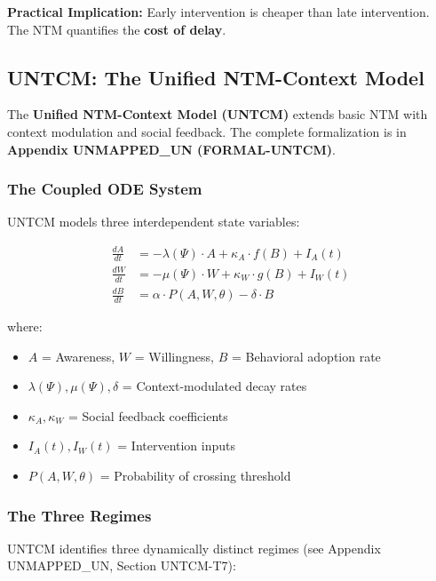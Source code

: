 \textbf{Practical Implication:} Early intervention is cheaper than late intervention. The NTM quantifies the \textbf{cost of delay}.

\subsection{UNTCM: The Unified NTM-Context Model}
\label{sec:ch16-untcm}

The \textbf{Unified NTM-Context Model (UNTCM)} extends basic NTM with context modulation and social feedback. The complete formalization is in \textbf{Appendix UNMAPPED_UN (FORMAL-UNTCM)}.

\subsubsection{The Coupled ODE System}

UNTCM models three interdependent state variables:

\begin{align}
\frac{dA}{dt} &= -\lambda(\Psi) \cdot A + \kappa_A \cdot f(B) + I_A(t) \label{eq:untcm-A} \\
\frac{dW}{dt} &= -\mu(\Psi) \cdot W + \kappa_W \cdot g(B) + I_W(t) \label{eq:untcm-W} \\
\frac{dB}{dt} &= \alpha \cdot P(A, W, \theta) - \delta \cdot B \label{eq:untcm-B}
\end{align}

where:
\begin{itemize}[nosep]
\item $A$ = Awareness, $W$ = Willingness, $B$ = Behavioral adoption rate
\item $\lambda(\Psi), \mu(\Psi), \delta$ = Context-modulated decay rates
\item $\kappa_A, \kappa_W$ = Social feedback coefficients
\item $I_A(t), I_W(t)$ = Intervention inputs
\item $P(A, W, \theta)$ = Probability of crossing threshold
\end{itemize}

\subsubsection{The Three Regimes}

UNTCM identifies three dynamically distinct regimes (see Appendix UNMAPPED_UN, Section UNTCM-T7):

